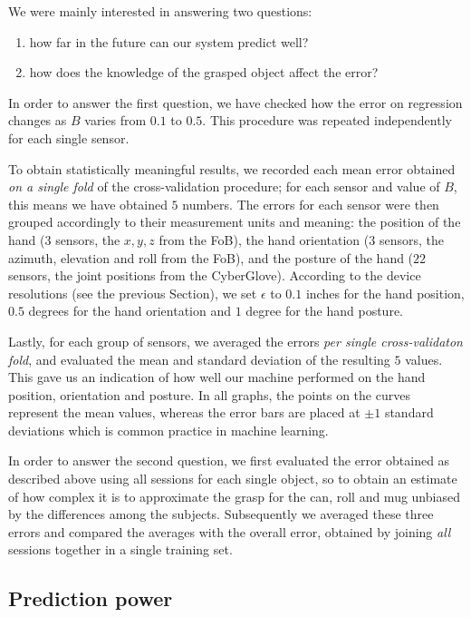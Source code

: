 We were mainly interested in answering two questions:

\begin{enumerate}

  \item how far in the future can our system predict well?

  \item how does the knowledge of the grasped object affect the error?

\end{enumerate}

In order to answer the first question, we have checked how the error
on regression changes as $B$ varies from $0.1$ to $0.5$. This
procedure was repeated independently for each single sensor.

To obtain statistically meaningful results, we recorded each mean
error obtained \emph{on a single fold} of the cross-validation
procedure; for each sensor and value of $B$, this means we have
obtained $5$ numbers. The errors for each sensor were then grouped
accordingly to their measurement units and meaning: the position of
the hand ($3$ sensors, the $x,y,z$ from the FoB), the hand orientation
($3$ sensors, the azimuth, elevation and roll from the FoB), and the
posture of the hand ($22$ sensors, the joint positions from the
CyberGlove). According to the device resolutions (see the previous
Section), we set $\epsilon$ to $0.1$ inches for the hand position,
$0.5$ degrees for the hand orientation and $1$ degree for the hand
posture.

Lastly, for each group of sensors, we averaged the errors \emph{per
single cross-validaton fold}, and evaluated the mean and standard
deviation of the resulting $5$ values. This gave us an indication of
how well our machine performed on the hand position, orientation and
posture. In all graphs, the points on the curves represent the mean
values, whereas the error bars are placed at $\pm 1$ standard
deviations which is common practice in machine learning. 

In order to answer the second question, we first evaluated the error
obtained as described above using all sessions for each single object,
so to obtain an estimate of how complex it is to approximate the grasp
for the can, roll and mug unbiased by the differences among the
subjects. Subsequently we averaged these three errors and compared the
averages with the overall error, obtained by joining \emph{all}
sessions together in a single training set.

\subsection{Prediction power}

